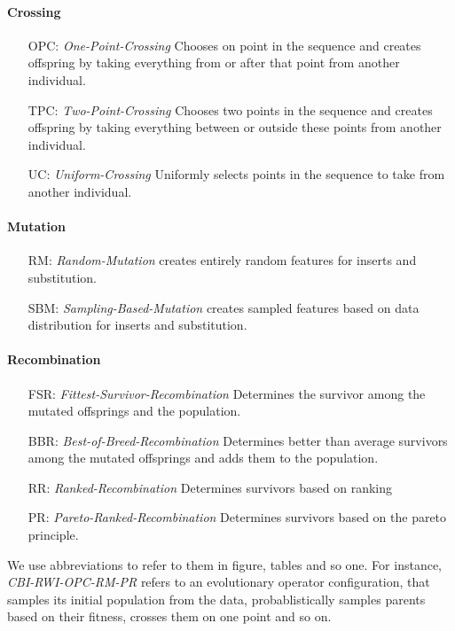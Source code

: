 \documentclass[./../../paper.tex]{subfiles}
\begin{document}
\paragraph{Crossing}
\begin{enumerate}
    \item[OPC:] \emph{One-Point-Crossing} Chooses on point in the sequence and creates offspring by taking everything from or after that point from another individual. 
    \item[TPC:] \emph{Two-Point-Crossing} Chooses two points in the sequence and creates offspring by taking everything between or outside these points from another individual. 
    \item[UC:] \emph{Uniform-Crossing} Uniformly selects points in the sequence to take from another individual. 
\end{enumerate}
\paragraph{Mutation}
\begin{enumerate}
    \item[RM:] \emph{Random-Mutation} creates entirely random features for inserts and substitution. 
    \item[SBM:] \emph{Sampling-Based-Mutation} creates sampled features based on data distribution for inserts and substitution. 
\end{enumerate}
\paragraph{Recombination}
\begin{enumerate}
    \item[FSR:] \emph{Fittest-Survivor-Recombination} Determines the survivor among the mutated offsprings and the population. 
    \item[BBR:] \emph{Best-of-Breed-Recombination} Determines better than average survivors among the mutated offsprings and adds them to the population. 
    \item[RR:] \emph{Ranked-Recombination} Determines survivors based on ranking 
    \item[PR:] \emph{Pareto-Ranked-Recombination} Determines survivors based on the pareto principle.
\end{enumerate}


We use abbreviations to refer to them in figure, tables and so one. For instance, \emph{CBI-RWI-OPC-RM-PR} refers to an evolutionary operator configuration, that samples its initial population from the data, probablistically samples parents based on their fitness, crosses them on one point and so on.
\end{document}
